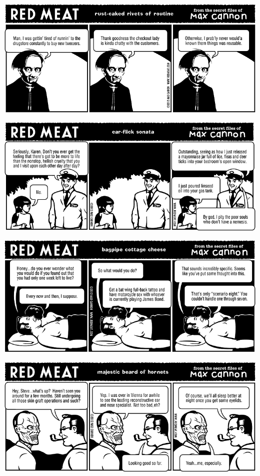 \documentclass[a4paper,twoside,11pt]{article}
\begin{document}
\includegraphics[width=\textwidth]{redmeat_2012-07-24.png}



\includegraphics[width=\textwidth]{redmeat_2012-07-31.png}



\includegraphics[width=\textwidth]{redmeat_2012-08-07.png}



\includegraphics[width=\textwidth]{redmeat_2012-08-14.png}
\end{document}
